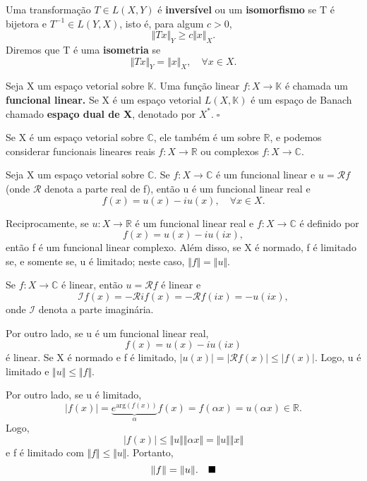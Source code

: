 \documentclass[../functional_analysis.tex]{subfiles}
\begin{document}
\begin{def*}
	Uma transformação \(T\in L(X, Y)\) é \textbf{inversível} ou um \textbf{isomorfismo} se T é bijetora e \(T^{-1}\in L(Y, X)\), isto é, para algum \(c>0\),
	\[
		\Vert Tx \Vert_{Y} \geq c \Vert x \Vert_{X}.
	\]
	Diremos que T é uma \textbf{isometria} se
	\[
		\Vert Tx \Vert_{Y} = \Vert x \Vert_{X},\quad \forall x\in X.
	\]
\end{def*}
\begin{def*}
	Seja X um espaço vetorial sobre \(\mathbb{K}.\) Uma função linear \(f:X\rightarrow \mathbb{K}\) é chamada um \textbf{funcional linear.}  Se X é um espaço vetorial \(L(X, \mathbb{K})\) é um espaço de Banach chamado \textbf{espaço dual de X}, denotado por \(X^{*}. \;\square\)
\end{def*}
\begin{tcolorbox}[
		skin=enhanced,
		title=Observação,
		fonttitle=\bfseries,
		colframe=black,
		colbacktitle=cyan!75!white,
		colback=cyan!15,
		colbacklower=black,
		coltitle=black,
		drop fuzzy shadow,
	]
	Se X é um espaço vetorial sobre \(\mathbb{C}\), ele também é um sobre \(\mathbb{R}\), e podemos considerar funcionais lineares reais \(f:X\rightarrow \mathbb{R}\) ou complexos \(f:X\rightarrow \mathbb{C}.\)
\end{tcolorbox}

\begin{prop*}
	Seja X um espaço vetorial sobre \(\mathbb{C}.\) Se \(f:X\rightarrow \mathbb{C}\) é um funcional linear e \(u= \mathcal{R}f\) (onde \(\mathcal{R}\) denota a parte real de f), então u é um funcional linear real e
	\[
		f(x)=u(x)-iu(x),\quad \forall x\in X.
	\]

	Reciprocamente, se \(u:X\rightarrow \mathbb{R}\) é um funcional linear real e \(f:X\rightarrow \mathbb{C}\) é definido por
	\[
		f(x)=u(x)-iu(ix),
	\]
	então f é um funcional linear complexo. Além disso, se X é normado, f é limitado se, e somente se, u é limitado; neste caso, \(\Vert f \Vert = \Vert u \Vert.\)
\end{prop*}
\begin{proof*}
	Se \(f:X\rightarrow \mathbb{C}\) é linear, então \(u=\mathcal{R}f\) é linear e
	\[
		\mathcal{I}f(x)=-\mathcal{R}if(x)=-\mathcal{R}f(ix)=-u(ix),
	\]
	onde \(\mathcal{I}\) denota a parte imaginária.

	Por outro lado, se u é um funcional linear real,
	\[
		f(x)=u(x)-iu(ix)
	\]
	é linear. Se X é normado e f é limitado, \(|u(x)|=|\mathcal{R}f(x)|\leq |f(x)|.\) Logo, u é limitado e \(\Vert u \Vert\leq \Vert f \Vert.\)

	Por outro lado, se u é limitado,
	\[
		|f(x)|=\underbrace{e^{\mathrm{arg}(f(x))}}_{\alpha }f(x)=f(\alpha x)=u(\alpha x)\in \mathbb{R}.
	\]
	Logo,
	\[
		|f(x)|\leq \Vert u \Vert \Vert \alpha x \Vert = \Vert u \Vert \Vert x \Vert
	\]
	e f é limitado com \(\Vert f \Vert\leq \Vert u \Vert.\) Portanto,
	\[
		\Vert f \Vert=\Vert u \Vert.\quad \text{$\blacksquare$}
	\]
\end{proof*}
\end{document}
